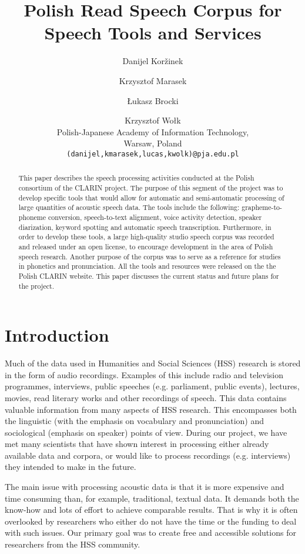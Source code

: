 \documentclass[a4paper,11pt]{article}
\title{Polish Read Speech Corpus for Speech Tools and Services}
\author{Danijel Kor\v{z}inek \and Krzysztof Marasek \and \L{}ukasz Brocki \and Krzysztof Wo\l{}k \\
 Polish-Japanese Academy of Information Technology, \\
 Warsaw, Poland \\
 {\tt (danijel,kmarasek,lucas,kwolk)@pja.edu.pl} \\
}
\begin{document}
\maketitle
\begin{abstract}

This paper describes the speech processing activities conducted at the Polish consortium of the CLARIN project. The purpose of this segment of the project was to develop specific tools that would allow for automatic and semi-automatic processing of large quantities of acoustic speech data. The tools include the following: grapheme-to-phoneme conversion, speech-to-text alignment, voice activity detection, speaker diarization, keyword spotting and automatic speech transcription.  Furthermore, in order to develop these tools, a large high-quality studio speech corpus was recorded and released under an open license, to encourage development in the area of Polish speech research. Another purpose of the corpus was to serve as a reference for studies in phonetics and pronunciation. All the tools and resources were released on the the Polish CLARIN website. This paper discusses the current status and future plans for the project.

\end{abstract}


\section{Introduction} \label{intro}

Much of the data used in Humanities and Social Sciences (HSS) research is stored in the form of audio recordings. Examples of this include radio and television programmes, interviews, public speeches (e.g. parliament, public events), lectures, movies, read literary works and other recordings of speech. This data contains valuable information from many aspects of HSS research. This encompasses both the linguistic (with the emphasis on vocabulary and pronunciation) and sociological (emphasis on speaker) points of view. During our project, we have met many scientists that have shown interest in processing either already available data and corpora, or would like to process recordings (e.g. interviews) they intended to make in the future.

The main issue with processing acoustic data is that it is more expensive and time consuming than, for example, traditional, textual data. It demands both the know-how and lots of effort to achieve comparable results. That is why it is often overlooked by researchers who either do not have the time or the funding to deal with such issues. Our primary goal was to create free and accessible solutions for researchers from the HSS community.
\end{document}
